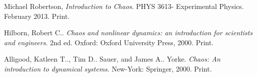 \documentclass[12pt]{report}
\theoremstyle{definition}
\begin{document}
\pagebreak

%
%


\begin{thebibliography}{9}
Michael Robertson,
\emph{Introduction to Chaos}. PHYS 3613- Experimental Physics. February 2013. Print.

Hilborn, Robert C.. \emph{Chaos and nonlinear dynamics: an introduction for scientists and engineers}. 2nd ed. Oxford: Oxford University Press, 2000. Print.

Alligood, Katleen T.., Tim D.. Sauer, and James A.. Yorke. 
\emph{Chaos: An introduction to dynamical systems}. New-York: Springer, 2000. Print. 


\end{thebibliography}
\end{document}
